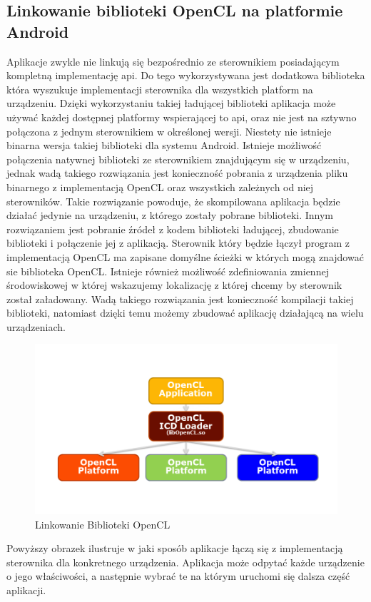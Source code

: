 \subsection{Linkowanie biblioteki OpenCL na platformie Android}
Aplikacje zwykle nie linkują się bezpośrednio ze sterownikiem posiadającym kompletną implementację api. Do tego wykorzystywana jest dodatkowa biblioteka która wyszukuje implementacji sterownika dla wszystkich platform na urządzeniu. Dzięki wykorzystaniu takiej ładującej biblioteki aplikacja może używać każdej dostępnej platformy wspierającej to api, oraz nie jest na sztywno połączona z jednym sterownikiem w określonej wersji.
Niestety nie istnieje binarna wersja takiej biblioteki dla systemu Android. Istnieje możliwość połączenia natywnej biblioteki ze sterownikiem znajdującym się w urządzeniu, jednak wadą takiego rozwiązania jest konieczność pobrania z urządzenia pliku binarnego z implementacją OpenCL oraz wszystkich zależnych od niej sterowników. Takie rozwiązanie powoduje, że skompilowana aplikacja będzie działać jedynie na urządzeniu, z którego zostały pobrane biblioteki.
Innym rozwiązaniem jest pobranie źródeł z kodem biblioteki ładującej, zbudowanie biblioteki i połączenie jej z aplikacją. Sterownik który będzie łączył program z implementacją OpenCL ma zapisane domyślne ścieżki w których mogą znajdować sie biblioteka OpenCL. Istnieje również możliwość zdefiniowania zmiennej środowiskowej w której wskazujemy lokalizację z której chcemy by sterownik został załadowany. Wadą takiego rozwiązania jest konieczność kompilacji takiej biblioteki, natomiast dzięki temu możemy zbudować aplikację działającą na wielu urządzeniach.
\begin{figure}[H]
	\includegraphics[scale=0.4]{imgs/icdLoader.png}
	\caption{Linkowanie Biblioteki OpenCL \cite{Loader}}
\end{figure}
Powyższy obrazek ilustruje w jaki sposób aplikacje łączą się z implementacją sterownika dla konkretnego urządzenia. Aplikacja może odpytać każde urządzenie o jego właściwości, a następnie wybrać te na którym uruchomi się dalsza część aplikacji.

